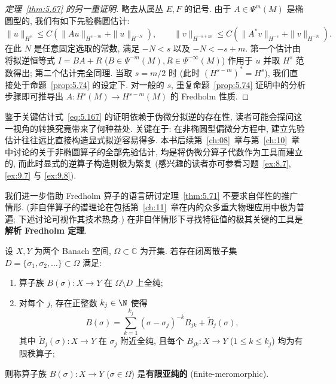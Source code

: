 \begin{proof}[定理~\ref{thm:5.67} 的另一重证明]
略去从属丛 $E, F$ 的记号. 由于 $A \in \Psi^m(M)$ 是椭圆型的, 我们有如下先验椭圆估计:
\begin{equation}\label{eq:5.167}
    \|u\|_{H^s} \le C \left( \|A u\|_{H^{s-m}} + \|u\|_{H^{-N}} \right), \qquad \|v\|_{H^{-s+m}} \le C \left( \|A^* v\|_{H^{-s}} + \|v\|_{H^{-N}} \right).
\end{equation}
在此 $N$ 是任意固定选取的常数, 满足 $-N < s$ 以及 $-N < -s + m$. 第一个估计由将拟逆恒等式 $I = B A + R$ ($B \in \Psi^{-m}(M), R \in \Psi^{-\infty}(M)$) 作用于 $u$ 并取 $H^s$ 范数得出; 第二个估计完全同理. 当取 $s = m/2$ 时 (此时 $(H^{s-m})^* = H^s$), 我们直接处于命题~\ref{prop:5.74} 的设定下. 对一般的 $s$, 重复命题~\ref{prop:5.74} 证明中的分析步骤即可推导出 $A \colon H^s(M) \to H^{s-m}(M)$ 的 Fredholm 性质.
\end{proof}

\begin{remark}[先验估计与拟逆的对比]\label{rem:5.75}
鉴于关键估计式~\eqref{eq:5.167} 的证明依赖于伪微分拟逆的存在性, 读者可能会探问这一视角的转换究竟带来了何种益处. 关键在于: 在非椭圆型偏微分方程中, 建立先验估计往往远比直接构造显式拟逆容易得多. 本书后续第~\ref{ch:08}~章与第~\ref{ch:10}~章中讨论的关于非椭圆算子的全部先验估计, 均是将伪微分算子代数作为工具而建立的, 而此时显式的逆算子构造则极为繁复 (感兴趣的读者亦可参看习题~\ref{ex:8.7}, \ref{ex:9.7} 与 \ref{ex:9.8}).
\end{remark}

我们进一步借助 Fredholm 算子的语言研讨定理~\ref{thm:5.71} 不要求自伴性的推广情形. (非自伴算子的谱理论在包括第~\ref{ch:11}~章在内的众多重大物理应用中极为普遍; 下述讨论可视作其技术热身.) 在非自伴情形下寻找特征值的极其关键的工具是\textbf{解析 Fredholm 定理}.

\begin{definition}[有限亚纯函数族]\label{def:5.76}
设 $X, Y$ 为两个 Banach 空间, $\Omega \subset \mathbb{C}$ 为开集. 若存在闭离散子集 $D = \{\sigma_1, \sigma_2, \ldots\} \subset \Omega$ 满足:
\begin{enumerate}
    \item 算子族 $B(\sigma) \colon X \to Y$ 在 $\Omega \setminus D$ 上全纯;
    \item 对每个 $j$, 存在正整数 $k_j \in \N$ 使得
    \begin{equation}\label{eq:5.168}
        B(\sigma) = \sum_{k=1}^{k_j} (\sigma - \sigma_j)^{-k} B_{jk} + \tilde{B}_j(\sigma),
    \end{equation}
    其中 $\tilde{B}_j(\sigma) \colon X \to Y$ 在 $\sigma_j$ 附近全纯, 且每个 $B_{jk} \colon X \to Y$ ($1 \le k \le k_j$) 均为有限秩算子;
\end{enumerate}
则称算子族 $B(\sigma) \colon X \to Y$ ($\sigma \in \Omega$) 是\textbf{有限亚纯的} (finite-meromorphic).
\end{definition}

